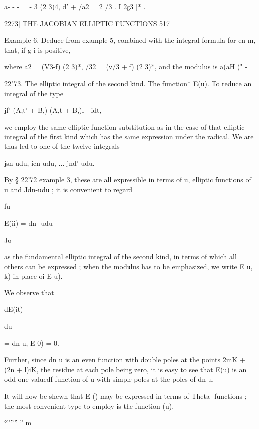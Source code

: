 a- -  - = - 3 (2 3)4, d' + /a2 = 2  /3 . I 2g3 |* . 



2273] THE JACOBIAN ELLIPTIC FUNCTIONS 517 

Example 6. Deduce from example 5, combined with the integral formula for en m, 
that, if g-i is positive, 

where a2 = (V3-f) (2 3)*, /32 = (v/3 + f) (2 3)*, and the modulus is a(aH )" - 

22"73. The elliptic integral of the second kind. The function* E(u). 
To reduce an integral of the type 

jf'  (A,t' + B,) (A,t  + B,)l - idt, 

we employ the same elliptic function substitution as in the case of that 
elliptic integral of the first kind which has the same expression under the 
radical. We are thus led to one of the twelve integrals 



jsn udu, icn  udu, ... jnd' udu. 



By § 22'72 example 3, these are all expressible in terms of u, elliptic 
functions of u and Jdn-udu ; it is convenient to regard 

fu 

E(ii) = dn- udu 



Jo 



as the fundamental elliptic integral of the second kind, in terms of which all 
others can be expressed ; when the modulus has to be emphasized, we write 
E  u, k) in place oi E u). 

We observe that 

dE(it) 



du 



= dn-u, E 0) = 0. 



Further, since dn u is an even function with double poles at the points 
2mK + (2n + l)iK, the residue at each pole being zero, it is easy to see that 
E(u) is an odd one-valuedf function of u with simple poles at the poles 
of dn u. 

It will now be shewn that E  () may be expressed in terms of Theta- 
functions ; the most convenient type to employ is the function (u). 



 °'''''' '' m  %



